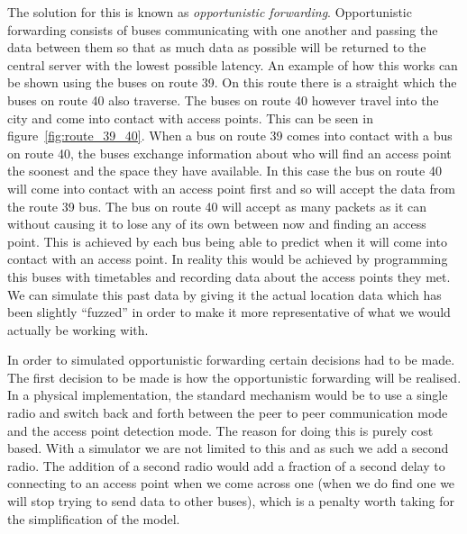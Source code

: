         The solution for this is known as \emph{opportunistic forwarding}. Opportunistic forwarding consists of buses communicating with one another and passing the data between them so that as much data as possible will be returned to the central server with the lowest possible latency. An example of how this works can be shown using the buses on route 39. On this route there is a straight which the buses on route 40 also traverse. The buses on route 40 however travel into the city and come into contact with access points. This can be seen in figure~\ref{fig:route_39_40}. When a bus on route 39 comes into contact with a bus on route 40, the buses exchange information about who will find an access point the soonest and the space they have available. In this case the bus on route 40 will come into contact with an access point first and so will accept the data from the route 39 bus.  The bus on route 40 will accept as many packets as it can without causing it to lose any of its own between now and finding an access point. This is achieved by each bus being able to predict when it will come into contact with an access point. In reality this would be achieved by programming this buses with timetables and recording data about the access points they met. We can simulate this past data by giving it the actual location data which has been slightly ``fuzzed'' in order to make it more representative of what we would actually be working with. 


        In order to simulated opportunistic forwarding certain decisions had to be made.  The first decision to be made is how the opportunistic forwarding will be realised. In a physical implementation, the standard mechanism would be to use a single radio and switch back and forth between the peer to peer communication mode and the access point detection mode. The reason for doing this is purely cost based. With a simulator we are not limited to this and as such we add a second radio. The addition of a second radio would add a fraction of a second delay to connecting to an access point when we come across one (when we do find one we will stop trying to send data to other buses), which is a penalty worth taking for the simplification of the model. 

